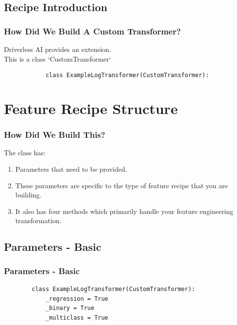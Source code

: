 \documentclass[11pt,
aspectratio=169,
hyperref={colorlinks}
]{beamer}
\begin{document}
\subsection{Recipe Introduction}
\begin{frame}[fragile]
        \frametitle{How Did We Build A Custom Transformer?}
        Driverless AI provides an extension. \\
        This is a class `CustomTransformer`
        \begin{verbatim}
            class ExampleLogTransformer(CustomTransformer):
        \end{verbatim}
\end{frame}
\section{Feature Recipe Structure}
\begin{frame}[fragile]
        \frametitle{How Did We Build This?}
        The class has:
        \begin{enumerate}
                \item Parameters that need to be provided. 
                \item These parameters are specific to the type of feature recipe that you are building. 
                \item It also has four methods which primarily handle your feature engineering transformation. 
        \end{enumerate}
\end{frame}
\subsection{Parameters - Basic}
\begin{frame}[fragile]
        \frametitle{Parameters - Basic}
        \begin{verbatim}
        class ExampleLogTransformer(CustomTransformer):
            _regression = True
            _binary = True
            _multiclass = True
        \end{verbatim}
\end{frame}
\end{document}
